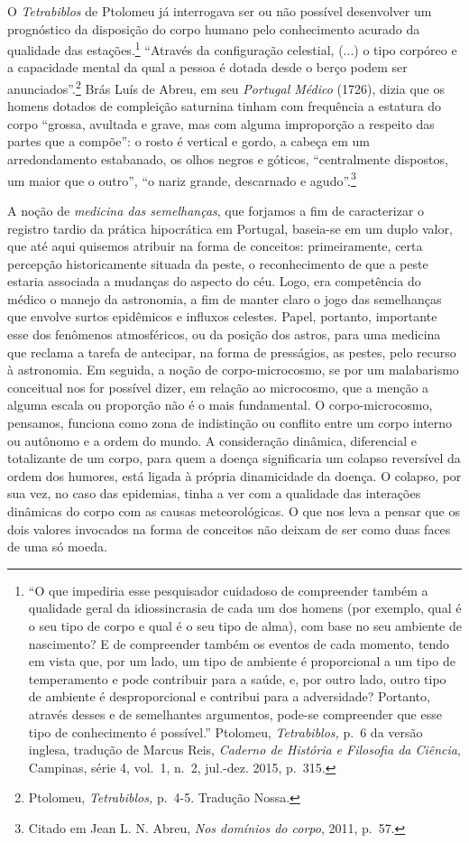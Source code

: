 O \emph{Tetrabiblos} de Ptolomeu já interrogava ser ou não possível
desenvolver um prognóstico da disposição do corpo humano pelo
conhecimento acurado da qualidade das estações.\footnote{``O que
  impediria esse pesquisador cuidadoso de compreender também a qualidade
  geral da idiossincrasia de cada um dos homens (por exemplo, qual é o
  seu tipo de corpo e qual é o seu tipo de alma), com base no seu
  ambiente de nascimento? E de compreender também os eventos de cada
  momento, tendo em vista que, por um lado, um tipo de ambiente é
  proporcional a um tipo de temperamento e pode contribuir para a saúde,
  e, por outro lado, outro tipo de ambiente é desproporcional e
  contribui para a adversidade? Portanto, através desses e de
  semelhantes argumentos, pode-se compreender que esse tipo de
  conhecimento é possível.'' Ptolomeu, \emph{Tetrabiblos,} p.~6 da
  versão inglesa, tradução de Marcus Reis, \emph{Caderno de História e
  Filosofia da Ciência}, Campinas, série 4, vol.~1, n.~2, jul.-dez.
  2015, p.~315.} ``Através da configuração celestial, (...) o tipo
corpóreo e a capacidade mental da qual a pessoa é dotada desde o berço
podem ser anunciados''.\footnote{Ptolomeu, \emph{Tetrabiblos,} p.~4-5.
  Tradução Nossa.} Brás Luís de Abreu, em seu \emph{Portugal Médico}
(1726), dizia que os homens dotados de compleição saturnina tinham com
frequência a estatura do corpo ``grossa, avultada e grave, mas com
alguma improporção a respeito das partes que a compõe'': o rosto é
vertical e gordo, a cabeça em um arredondamento estabanado, os olhos
negros e góticos, ``centralmente dispostos, um maior que o outro'', ``o
nariz grande, descarnado e agudo''.\footnote{Citado em Jean L. N. Abreu,
  \emph{Nos domínios do corpo}, 2011, p.~57.}

A noção de \emph{medicina das semelhanças}, que forjamos a fim de
caracterizar o registro tardio da prática hipocrática em Portugal,
baseia-se em um duplo valor, que até aqui quisemos atribuir na forma de
conceitos: primeiramente, certa percepção historicamente situada da
peste, o reconhecimento de que a peste estaria associada a mudanças do
aspecto do céu. Logo, era competência do médico o manejo da astronomia,
a fim de manter claro o jogo das semelhanças que envolve surtos
epidêmicos e influxos celestes. Papel, portanto, importante esse dos
fenômenos atmosféricos, ou da posição dos astros, para uma medicina que
reclama a tarefa de antecipar, na forma de presságios, as pestes, pelo
recurso à astronomia. Em seguida, a noção de corpo-microcosmo, se por um
malabarismo conceitual nos for possível dizer, em relação ao microcosmo,
que a menção a alguma escala ou proporção não é o mais fundamental. O
corpo-microcosmo, pensamos, funciona como zona de indistinção ou
conflito entre um corpo interno ou autônomo e a ordem do mundo. A
consideração dinâmica, diferencial e totalizante de um corpo, para quem
a doença significaria um colapso reversível da ordem dos humores, está
ligada à própria dinamicidade da doença. O colapso, por sua vez, no caso
das epidemias, tinha a ver com a qualidade das interações dinâmicas do
corpo com as causas meteorológicas. O que nos leva a pensar que os dois
valores invocados na forma de conceitos não deixam de ser como duas
faces de uma só moeda.


